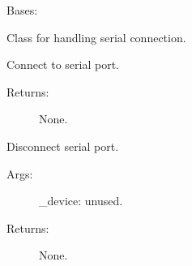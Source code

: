 \documentclass[letterpaper,10pt,english]{sphinxmanual}
\begin{document}
\begin{fulllineitems}
\label{\detokenize{QConnectBase:QConnectBase.serialclient.serial_base.SerialSocket}}
\sphinxAtStartPar
Bases: {\hyperref[\detokenize{QConnectBase:QConnectBase.connection_base.ConnectionBase}]{}}

\sphinxAtStartPar
Class for handling serial connection.

\begin{fulllineitems}
\label{\detokenize{QConnectBase:QConnectBase.serialclient.serial_base.SerialSocket.connect}}
\sphinxAtStartPar
Connect to serial port.
\begin{description}
\item[{Returns:}] \leavevmode
\sphinxAtStartPar
None.

\end{description}

\end{fulllineitems}


\begin{fulllineitems}
\label{\detokenize{QConnectBase:QConnectBase.serialclient.serial_base.SerialSocket.disconnect}}
\sphinxAtStartPar
Disconnect serial port.
\begin{description}
\item[{Args:}] \leavevmode
\sphinxAtStartPar
\_device: unused.

\item[{Returns:}] \leavevmode
\sphinxAtStartPar
None.

\end{description}

\end{fulllineitems}


\end{fulllineitems}
\end{document}
